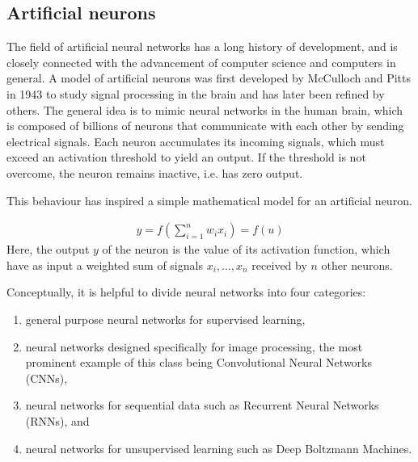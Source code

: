 \documentclass[letterpaper,10pt,english]{sphinxmanual}
\begin{document}
\subsection{Artificial neurons}
\label{\detokenize{chapter6:artificial-neurons}}
The field of artificial neural networks has a long history of
development, and is closely connected with the advancement of computer
science and computers in general. A model of artificial neurons was
first developed by McCulloch and Pitts in 1943 to study signal
processing in the brain and has later been refined by others. The
general idea is to mimic neural networks in the human brain, which is
composed of billions of neurons that communicate with each other by
sending electrical signals.  Each neuron accumulates its incoming
signals, which must exceed an activation threshold to yield an
output. If the threshold is not overcome, the neuron remains inactive,
i.e. has zero output.

This behaviour has inspired a simple mathematical model for an artificial neuron.




\begin{equation*}
\begin{split}
\begin{equation}
 y = f\left(\sum_{i=1}^n w_ix_i\right) = f(u)
\label{artificialNeuron} \tag{1}
\end{equation}
\end{split}
\end{equation*}
Here, the output \(y\) of the neuron is the value of its activation function, which have as input
a weighted sum of signals \(x_i, \dots ,x_n\) received by \(n\) other neurons.

Conceptually, it is helpful to divide neural networks into four
categories:
\begin{enumerate}
%
\item {} 
general purpose neural networks for supervised learning,

\item {} 
neural networks designed specifically for image processing, the most prominent example of this class being Convolutional Neural Networks (CNNs),

\item {} 
neural networks for sequential data such as Recurrent Neural Networks (RNNs), and

\item {} 
neural networks for unsupervised learning such as Deep Boltzmann Machines.

\end{enumerate}
\end{document}
